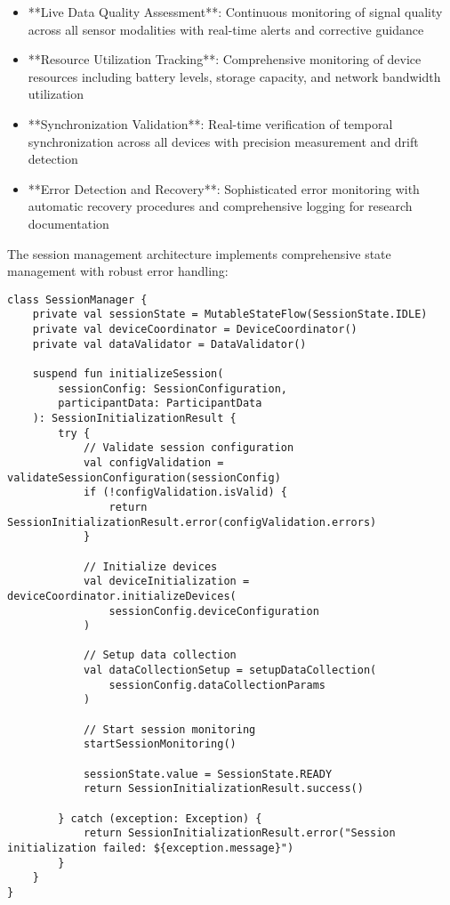\documentclass[12pt,a4paper]{article}
\begin{document}
\begin{itemize}
\item **Live Data Quality Assessment**: Continuous monitoring of signal quality across all sensor modalities with real-time
  alerts and corrective guidance
\item **Resource Utilization Tracking**: Comprehensive monitoring of device resources including battery levels, storage
  capacity, and network bandwidth utilization
\item **Synchronization Validation**: Real-time verification of temporal synchronization across all devices with precision
  measurement and drift detection
\item **Error Detection and Recovery**: Sophisticated error monitoring with automatic recovery procedures and comprehensive
  logging for research documentation

\end{itemize}
The session management architecture implements comprehensive state management with robust error handling:

\begin{verbatim}
class SessionManager {
    private val sessionState = MutableStateFlow(SessionState.IDLE)
    private val deviceCoordinator = DeviceCoordinator()
    private val dataValidator = DataValidator()

    suspend fun initializeSession(
        sessionConfig: SessionConfiguration,
        participantData: ParticipantData
    ): SessionInitializationResult {
        try {
            // Validate session configuration
            val configValidation = validateSessionConfiguration(sessionConfig)
            if (!configValidation.isValid) {
                return SessionInitializationResult.error(configValidation.errors)
            }

            // Initialize devices
            val deviceInitialization = deviceCoordinator.initializeDevices(
                sessionConfig.deviceConfiguration
            )

            // Setup data collection
            val dataCollectionSetup = setupDataCollection(
                sessionConfig.dataCollectionParams
            )

            // Start session monitoring
            startSessionMonitoring()

            sessionState.value = SessionState.READY
            return SessionInitializationResult.success()

        } catch (exception: Exception) {
            return SessionInitializationResult.error("Session initialization failed: ${exception.message}")
        }
    }
}
\end{verbatim}
\end{document}

